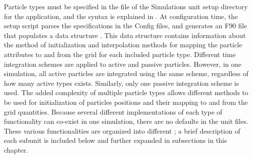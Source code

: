 Particle 
types must be specified in the  file of the Simulations
unit setup directory for the application, and the syntax is explained
in .
At configuration time, the setup script parses the 
specifications in the Config files, and generates an F90 file 
that
populates a data structure . This data structure
contains information about the method of initialization and
interpolation methods for mapping the particle attributes to and from
the grid for each included particle type. Different time integration
schemes are applied to active and passive 
particles. However, in one simulation, all active particles are
integrated using the same 
scheme, regardless of how many active types exists. 
Similarly, only one passive integration scheme is used.
The added complexity of multiple particle types allows different methods
to be used for initialization of particles positions and their
mapping to and from the grid quantities.
Because several different implementations of each type of
functionality can co-exist in one simulation, there are no defaults in
the  unit  files. These various functionalities are organized
into different \subunits; a brief description of each subunit is 
included below and further expanded in subsections in this chapter.  

